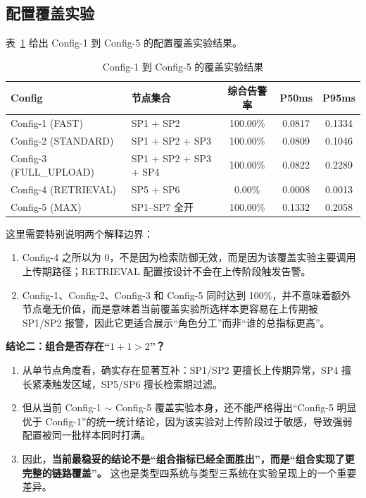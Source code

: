 \documentclass[11pt,a4paper]{ctexart}
\begin{document}
\subsection{配置覆盖实验}
表~\ref{tab:type4-configs} 给出 Config-1 到 Config-5 的配置覆盖实验结果。

\begin{table}[H]
\centering
\caption{Config-1 到 Config-5 的覆盖实验结果}
\label{tab:type4-configs}
\begin{tabular}{l p{4.6cm} c c c}
\toprule
Config & 节点集合 & 综合告警率 & P50ms & P95ms \\
\midrule
Config-1 (FAST) & SP1 + SP2 & 100.00\% & 0.0817 & 0.1334 \\
Config-2 (STANDARD) & SP1 + SP2 + SP3 & 100.00\% & 0.0809 & 0.1046 \\
Config-3 (FULL\_UPLOAD) & SP1 + SP2 + SP3 + SP4 & 100.00\% & 0.0822 & 0.2289 \\
Config-4 (RETRIEVAL) & SP5 + SP6 & 0.00\% & 0.0008 & 0.0013 \\
Config-5 (MAX) & SP1--SP7 全开 & 100.00\% & 0.1332 & 0.2058 \\
\bottomrule
\end{tabular}
\end{table}

这里需要特别说明两个解释边界：
\begin{enumerate}[leftmargin=2em]
  \item Config-4 之所以为 0，不是因为检索防御无效，而是因为该覆盖实验主要调用上传期路径；RETRIEVAL 配置按设计不会在上传阶段触发告警。
  \item Config-1、Config-2、Config-3 和 Config-5 同时达到 100\%，并不意味着额外节点毫无价值，而是意味着当前覆盖实验所选样本更容易在上传期被 SP1/SP2 报警，因此它更适合展示“角色分工”而非“谁的总指标更高”。
\end{enumerate}

\textbf{结论二：组合是否存在“$1+1>2$”？}
\begin{enumerate}[leftmargin=2em]
  \item 从单节点角度看，确实存在显著互补：SP1/SP2 更擅长上传期异常，SP4 擅长紧凑触发区域，SP5/SP6 擅长检索期过滤。
  \item 但从当前 Config-1 $\sim$ Config-5 覆盖实验本身，还不能严格得出“Config-5 明显优于 Config-1”的统一统计结论，因为该实验对上传阶段过于敏感，导致强弱配置被同一批样本同时打满。
  \item 因此，\textbf{当前最稳妥的结论不是“组合指标已经全面胜出”，而是“组合实现了更完整的链路覆盖”。} 这也是类型四系统与类型三系统在实验呈现上的一个重要差异。
\end{enumerate}
\end{document}
